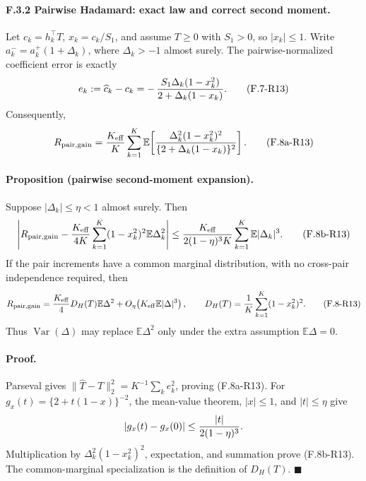 
\paragraph{F.3.2 Pairwise Hadamard: exact law and correct second moment.}
Let $c_k=h_k^\top T$, $x_k=c_k/S_1$, and assume $T\ge0$ with
$S_1>0$, so $|x_k|\le1$.  Write
$a_k^-=a_k^+(1+\Delta_k)$, where $\Delta_k>-1$ almost surely.  The
pairwise-normalized coefficient error is exactly
\begin{equation}
 e_k:=\widehat c_k-c_k
 =-\,{S_1\Delta_k(1-x_k^2)\over
       2+\Delta_k(1-x_k)}. \tag{F.7-R13}
\end{equation}
Consequently,
\begin{equation}
 R_{\mathrm{pair,gain}}
 ={K_{\mathrm{eff}}\over K}\sum_{k=1}^K
 \mathbb E\!\left[
 {\Delta_k^2(1-x_k^2)^2\over
  \{2+\Delta_k(1-x_k)\}^2}\right]. \tag{F.8a-R13}
\end{equation}

\paragraph{Proposition (pairwise second-moment expansion).}
Suppose $|\Delta_k|\le\eta<1$ almost surely.  Then
\begin{align}
 \left|R_{\mathrm{pair,gain}}
 -{K_{\mathrm{eff}}\over4K}\sum_{k=1}^K
  (1-x_k^2)^2\mathbb E\Delta_k^2\right|
 \le {K_{\mathrm{eff}}\over2(1-\eta)^3K}
 \sum_{k=1}^K\mathbb E|\Delta_k|^3. \tag{F.8b-R13}
\end{align}
If the pair increments have a common marginal distribution, with no
cross-pair independence required, then
\begin{equation}
 R_{\mathrm{pair,gain}}
 ={K_{\mathrm{eff}}\over4}D_H(T)\mathbb E\Delta^2
 +O_\eta\!\left(K_{\mathrm{eff}}\mathbb E|\Delta|^3\right),
 \qquad
 D_H(T)={1\over K}\sum_{k=1}^K(1-x_k^2)^2. \tag{F.8-R13}
\end{equation}
Thus $\operatorname{Var}(\Delta)$ may replace
$\mathbb E\Delta^2$ only under the extra assumption
$\mathbb E\Delta=0$.

\paragraph{Proof.}
Parseval gives
$\|\widehat T-T\|_2^2=K^{-1}\sum_ke_k^2$, proving
(F.8a-R13).  For $g_x(t)=\{2+t(1-x)\}^{-2}$, the mean-value theorem,
$|x|\le1$, and $|t|\le\eta$ give
\[
 |g_x(t)-g_x(0)|\le {|t|\over2(1-\eta)^3}.
\]
Multiplication by $\Delta_k^2(1-x_k^2)^2$, expectation, and summation
prove (F.8b-R13).  The common-marginal specialization is the definition
of $D_H(T)$.
\hfill$\blacksquare$

